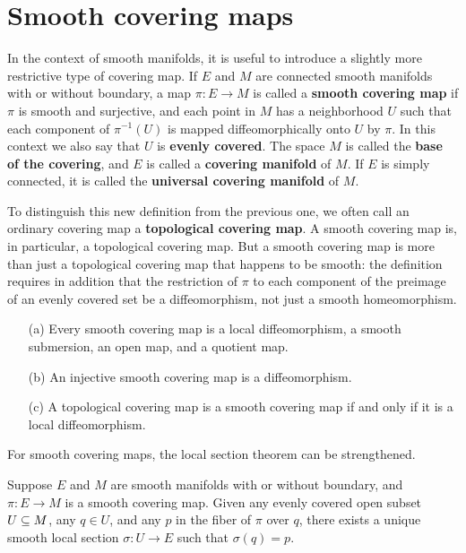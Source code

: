 \section{Smooth covering maps}
In the context of smooth manifolds, it is useful to introduce a slightly more restrictive type of covering map. If $E$ and $M$ are connected smooth manifolds with
or without boundary, a map $\pi:E\to M$ is called a \textbf{smooth covering map} if $\pi$ is smooth and surjective, and each point in $M$ has a neighborhood $U$ such that each component of $\pi^{-1}(U)$ is mapped diffeomorphically onto $U$ by $\pi$. In this context we also say that $U$ is \textbf{evenly covered}. The space $M$ is called the \textbf{base of the covering}, and $E$ is called a \textbf{covering manifold} of $M$. If $E$ is simply connected, it is called the \textbf{universal covering manifold} of $M$.\par
To distinguish this new definition from the previous one, we often call an ordinary covering map a \textbf{topological covering map}. A smooth covering map is, in particular, a topological covering map. But a smooth covering map is more than just
a topological covering map that happens to be smooth: the definition requires in
addition that the restriction of $\pi$ to each component of the preimage of an evenly
covered set be a diffeomorphism, not just a smooth homeomorphism.
\begin{proposition}\label{smooth cover prop}
\mbox{}
\begin{itemize}
\item[(a)]Every smooth covering map is a local diffeomorphism, a smooth submersion,
an open map, and a quotient map.
\item[(b)]An injective smooth covering map is a diffeomorphism.
\item[(c)]A topological covering map is a smooth covering map if and only if it is a local diffeomorphism.
\end{itemize}
\end{proposition}
For smooth covering maps, the local section theorem can be strengthened.
\begin{theorem}\label{local section unique}
Suppose $E$ and $M$ are smooth manifolds with or without boundary, and $\pi:E\to M$ is a smooth covering map. Given any evenly covered open subset $U\subseteq M$, any $q\in U$, and any $p$ in the fiber of $\pi$ over $q$, there exists a unique smooth local section $\sigma:U\to E$ such that $\sigma(q)=p$.
\end{theorem}
